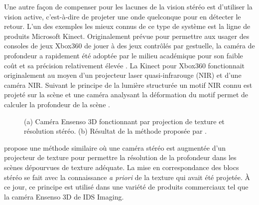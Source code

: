 Une autre façon de compenser pour les lacunes de la vision stéréo est d'utiliser la vision active, c'est-à-dire de projeter une onde quelconque pour en détecter le retour. L'un des exemples les mieux connus de ce type de système est la ligne de produits Microsoft Kinect. Originalement prévue pour permettre aux usager des consoles de jeux Xbox360 de jouer à des jeux contrôlés par gestuelle, la caméra de profondeur a rapidement été adoptée par le milieu académique pour son faible coût et sa précision relativement élevée \citep{khoshelham2012}. La Kinect pour Xbox360 fonctionnait originalement au moyen d'un projecteur laser quasi-infrarouge (NIR) et d'une caméra NIR. Suivant le principe de la \guillemotleft lumière structurée \guillemotright un motif NIR connu est projeté sur la scène et une caméra analysant la déformation du motif permet de calculer la profondeur de la scène \citep{Zhang2012}.

\begin{figure}[!h]
  \centering
  \caption[Caméras 3D par projection de texture]{
    (a) Caméra Ensenso 3D fonctionnant par projection de texture et résolution stéréo.
    (b) Résultat de la méthode proposée par \citep{konolige2010}.
  }
  \label{fig:3d_cams}
\end{figure}

\cite{konolige2010} propose une méthode similaire où une caméra stéréo est augmentée d'un projecteur de texture pour permettre la résolution de la profondeur dans les scènes dépourvues de texture adéquate. La mise en correspondance des blocs stéréo se fait avec la connaissance \textit{a priori} de la texture qui avait été projetée. À ce jour, ce principe est utilisé dans une variété de produits commerciaux tel que la caméra Ensenso 3D de IDS Imaging.

